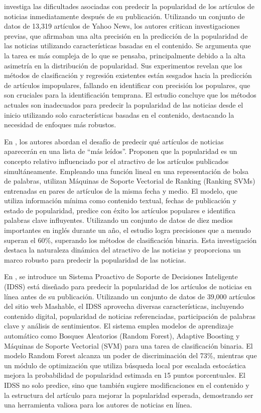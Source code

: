 \documentclass[
  number,
  preprint,
  3p,
  twocolumn]{elsarticle}
\begin{document}
\citep{arapakis2014} investiga las dificultades asociadas con predecir
la popularidad de los artículos de noticias inmediatamente después de su
publicación. Utilizando un conjunto de datos de 13,319 artículos de
Yahoo News, los autores critican investigaciones previas, que afirmaban
una alta precisión en la predicción de la popularidad de las noticias
utilizando características basadas en el contenido. Se argumenta que la
tarea es más compleja de lo que se pensaba, principalmente debido a la
alta asimetría en la distribución de popularidad. Sus experimentos
revelan que los métodos de clasificación y regresión existentes están
sesgados hacia la predicción de artículos impopulares, fallando en
identificar con precisión los populares, que son cruciales para la
identificación temprana. El estudio concluye que los métodos actuales
son inadecuados para predecir la popularidad de las noticias desde el
inicio utilizando solo características basadas en el contenido,
destacando la necesidad de enfoques más robustos.

En \citep{hensinger2012}, los autores abordan el desafío de predecir qué
artículos de noticias aparecerán en una lista de ``más leídos''.
Proponen que la popularidad es un concepto relativo influenciado por el
atractivo de los artículos publicados simultáneamente. Empleando una
función lineal en una representación de bolsa de palabras, utilizan
Máquinas de Soporte Vectorial de Ranking (Ranking SVMs) entrenadas en
pares de artículos de la misma fecha y medio. El modelo, que utiliza
información mínima como contenido textual, fechas de publicación y
estado de popularidad, predice con éxito los artículos populares e
identifica palabras clave influyentes. Utilizando un conjunto de datos
de diez medios importantes en inglés durante un año, el estudio logra
precisiones que a menudo superan el 60\%, superando los métodos de
clasificación binaria. Esta investigación destaca la naturaleza dinámica
del atractivo de las noticias y proporciona un marco robusto para
predecir la popularidad de las noticias.

En \citep{fernandes2015}, se introduce un Sistema Proactivo de Soporte
de Decisiones Inteligente (IDSS) está diseñado para predecir la
popularidad de los artículos de noticias en línea antes de su
publicación. Utilizando un conjunto de datos de 39,000 artículos del
sitio web Mashable, el IDSS aprovecha diversas características,
incluyendo contenido digital, popularidad de noticias referenciadas,
participación de palabras clave y análisis de sentimientos. El sistema
emplea modelos de aprendizaje automático como Bosques Aleatorios (Random
Forest), Adaptive Boosting y Máquinas de Soporte Vectorial (SVM) para
una tarea de clasificación binaria. El modelo Random Forest alcanza un
poder de discriminación del 73\%, mientras que un módulo de optimización
que utiliza búsqueda local por escalada estocástica mejora la
probabilidad de popularidad estimada en 15 puntos porcentuales. El IDSS
no solo predice, sino que también sugiere modificaciones en el contenido
y la estructura del artículo para mejorar la popularidad esperada,
demostrando ser una herramienta valiosa para los autores de noticias en
línea.
\end{document}
